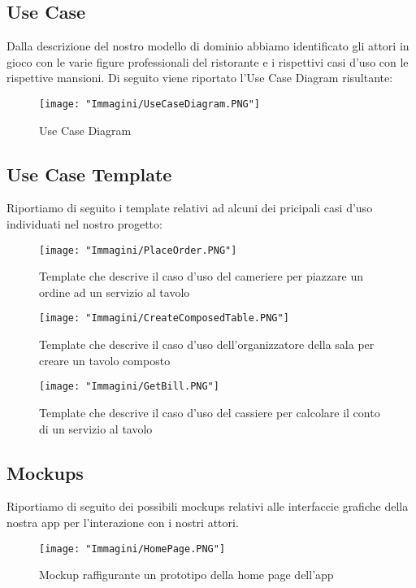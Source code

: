 \documentclass{article}
\begin{document}
\subsection{Use Case}

Dalla descrizione del nostro modello di dominio abbiamo identificato gli attori in gioco con le varie figure professionali del ristorante e i rispettivi casi d'uso con le rispettive mansioni. Di seguito viene riportato l'Use Case Diagram risultante:

\begin{figure}[!h]
\centering
\texttt{[image: "Immagini/UseCaseDiagram.PNG"]}
\caption{Use Case Diagram}
\end{figure}

\newpage

\subsection{Use Case Template}
Riportiamo di seguito i template relativi ad alcuni dei pricipali casi d'uso individuati nel nostro progetto:

\begin{figure}[!h]
\centering
\texttt{[image: "Immagini/PlaceOrder.PNG"]}
\caption{Template che descrive il caso d'uso del cameriere per piazzare un ordine ad un servizio al tavolo}
\end{figure}

\begin{figure}[!h]
\centering
\texttt{[image: "Immagini/CreateComposedTable.PNG"]}
\caption{Template che descrive il caso d'uso dell'organizzatore della sala per creare un tavolo composto}
\end{figure}

\newpage

\begin{figure}[!h]
\centering
\texttt{[image: "Immagini/GetBill.PNG"]}
\caption{Template che descrive il caso d'uso del cassiere per calcolare il conto di un servizio al tavolo}
\end{figure}

\subsection{Mockups}
Riportiamo di seguito dei possibili mockups relativi alle interfaccie grafiche della nostra app per l'interazione con i nostri attori.

\begin{figure}[!h]
\centering
\texttt{[image: "Immagini/HomePage.PNG"]}
\caption{Mockup raffigurante un prototipo della home page dell'app}
\end{figure}
\end{document}
